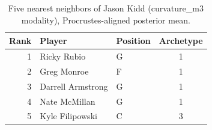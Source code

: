 \begin{table}[htbp]
  \centering\small
  \begin{tabular}{rllc}
    \toprule
    Rank & Player & Position & Archetype \\
    \midrule
    1 & Ricky Rubio & G & 1 \\
    2 & Greg Monroe & F & 1 \\
    3 & Darrell Armstrong & G & 1 \\
    4 & Nate McMillan & G & 1 \\
    5 & Kyle Filipowski & C & 3 \\
    \bottomrule
  \end{tabular}
  \caption{Five nearest neighbors of Jason Kidd (curvature_m3 modality), Procrustes-aligned posterior mean.}
  \label{tab:Jason_Kidd_neighbors_curvature_m3}
\end{table}

